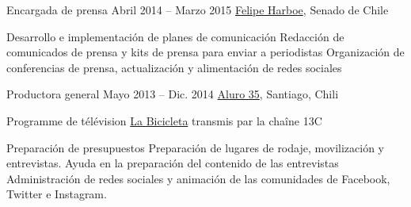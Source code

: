 \begin{joblist}
{		%
	}



\item[Encargada de prensa ]{Abril 2014 -- Marzo 2015}
     { \href{https://www.harboe.cl/}{Felipe Harboe}, Senado de Chile } 
	 {
                
		\iftbftiny \vspace{-0.5cm} \fi
			\begin{itemize}
			  \iftbftiny \setlength\itemsep{-3pt} \fi
			  \cvitem[\checkmark] Desarrollo e implementación de planes de comunicación
			  \cvitem[\checkmark] Redacción de comunicados de prensa y kits de prensa para enviar a periodistas
			  \cvitem[\checkmark] Organización de conferencias de prensa, actualización y alimentación de redes sociales
			\end{itemize}     
			
	}
    
    
    
\item[Productora general]{Mayo 2013 -- Dic. 2014}
     {\href{https://www.aluro35.com/}  {Aluro 35}, Santiago, Chili}
     {Programme de télévision \href{http://www.13.cl/c/programas/la-bicicleta}{La Bicicleta} transmis par la chaîne 13C \\
			
		\iftbftiny \vspace{-0.5cm} \fi
			\begin{itemize}
			  \iftbftiny \setlength\itemsep{-3pt} \fi
			  \cvitem[\checkmark] Preparación de presupuestos                  
			  \cvitem[\checkmark] Preparación de lugares de rodaje, movilización y entrevistas. Ayuda en la preparación del contenido de las entrevistas
			  \cvitem[\checkmark] Administración de redes sociales y animación de las comunidades de Facebook, Twitter e Instagram.          
			\end{itemize}     
			
}
\end{joblist}
